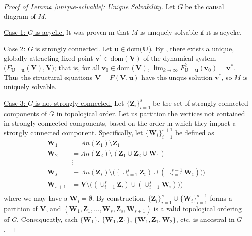\documentclass[letterpaper,10pt]{article}
\newtheorem{lemma}[theorem]{Lemma}
\begin{document}

\begin{proof}[Proof of Lemma \ref{unique-solvable}: Unique Solvability]
Let $G$ be the causal diagram of $M$. 

\underline{Case 1: $G$ is acyclic.}
It was proven in \cite{Foundations} that $M$ is uniquely solvable if it is acyclic.

\underline{Case 2: $G$ is strongly connected.}
Let $\mathbf{u}\in\text{dom}(\mathbf{U}$).
By \cite{ReberIntrinsic}, there exists a unique, globally attracting fixed point $\mathbf{v}^*\in\text{dom}(\mathbf{V})$ of the dynamical system $\big(F_{\mathbf{U}=\mathbf{u}}(\mathbf{V}),\mathbf{V}\big)$; that is, for all $\mathbf{v}_0\in\text{dom}(\mathbf{V})$, $\lim_{k\to\infty}F^{k}_{\mathbf{U}=\mathbf{u}}(\mathbf{v}_0)=\mathbf{v}^*$.
Thus the structural equations $\mathbf{V}=F(\mathbf{V},\mathbf{u})$ have the unque solution $\mathbf{v}^*$, so $M$ is uniquely solvable.

\underline{Case 3: $G$ is not strongly connected.}
Let $\{\mathbf{Z}_i\}_{i=1}^s$ be the set of strongly connected components of $G$ in topological order.
Let us partition the vertices not contained in strongly connected components, based on the order in which they impact a strongly connected component. Specifically, let $\{\mathbf{W}_i\}_{i=1}^{s+1}$ be defined as 
\begin{align*}
\mathbf{W}_1 &= An(\mathbf{Z}_1)\setminus \mathbf{Z}_1 \\
\mathbf{W}_2 &= An(\mathbf{Z}_2)\setminus (\mathbf{Z}_1\cup\mathbf{Z}_2\cup\mathbf{W}_1) \\
&\vdots \\
\mathbf{W}_s &= An(\mathbf{Z}_s)\setminus \big((\cup_{i=1}^s\mathbf{Z}_i)\cup(\cup_{i=1}^{s-1}\mathbf{W}_i))\big) \\
\mathbf{W}_{s+1} &= \mathbf{V}\setminus \big((\cup_{i=1}^s\mathbf{Z}_i)\cup(\cup_{i=1}^{s}\mathbf{W}_i))\big) \\
\end{align*}
where we may have a $\mathbf{W}_i=\emptyset$.
By construction, $\{\mathbf{Z}_i\}_{i=1}^s \cup \{\mathbf{W}_i\}_{i=1}^{s+1}$ forms a partition of $\mathbf{V}$, and $(\mathbf{W}_1,\mathbf{Z}_1,\hdots,\mathbf{W}_s,\mathbf{Z}_s,\mathbf{W}_{s+1})$ is a valid topological ordering of $G$.
Consequently, each $\{\mathbf{W}_1\}$, $\{\mathbf{W}_1,\mathbf{Z}_1\}$, $\{\mathbf{W}_1,\mathbf{Z}_1,\mathbf{W}_2\}$, etc. is ancestral in $G$.


\end{proof}
\end{document}
